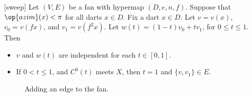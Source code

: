\begin{lemma}[sweep]\label{lemma:sweep}  
Let $(V,E)$ be a fan with hypermap $(D,e,n,f)$.  
Suppose that $\op{azim}(x)<\pi$
for all darts $x\in D$.  Fix a dart $x\in D$.
Let $v = v(x)$, $v_0 = v(f x)$,
and $v_1 = v(f^2 x)$.  Let $w(t) = (1-t) v_0 + t v_1$, for
$0\le t\le 1$.  Then
\begin{itemize}
\item $v$ and $w(t)$ are independent for each $t\in[0,1]$.
\item If $0 < t \le 1$, and $C^0(t)$ meets $X$, then $t=1$ and $\{v,v_1\}\in E$.
\end{itemize}
\end{lemma}


\begin{figure}[htb]
  \centering
  \caption{Adding an edge to the fan.}
  \label{fig:vt}
\end{figure}


